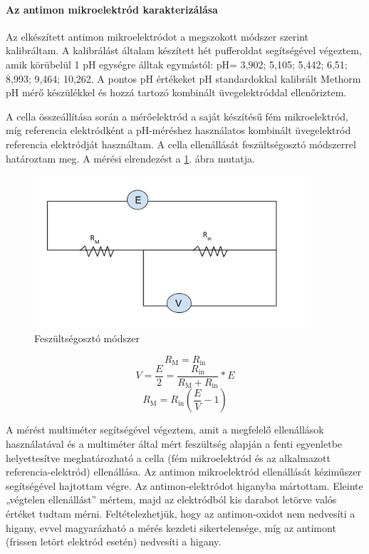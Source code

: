 \paragraph{Az antimon mikroelektród karakterizálása}\label{karakterizalas}
Az elkészített antimon mikroelektródot a megszokott módszer szerint kalibráltam. A kalibrálást általam készített hét pufferoldat segítségével végeztem, amik körübelül 1 pH egységre álltak egymástól: pH= 3,902; 5,105; 5,442; 6,51; 8,993; 9,464; 10,262. A pontos pH értékeket pH standardokkal kalibrált Methorm pH mérő készülékkel és hozzá tartozó kombinált üvegelektróddal ellenőriztem. 

A cella összeállítása során a mérőelektród a saját készítésű fém mikroelektród, míg referencia elektródként a pH-méréshez használatos kombinált üvegelektród referencia elektródját használtam.
A cella ellenállását feszültségosztó módszerrel határoztam meg. A mérési elrendezést a \ref{fig:feszultsegoszto}. ábra mutatja. 

\begin{figure}[h]
\centering
\includegraphics[width=0.9\textwidth]{img/feszultsegoszto.png}
\caption{Feszültségosztó módszer}
\label{fig:feszultsegoszto}
\end{figure}

\begin{equation}
R_\text{M} = R_\text{in}
\end{equation}
\begin{equation}
V = \frac{E}{2} = \frac{R_\text{in}}{R_\text{M} + R_\text{in}} * E
\end{equation}
\begin{equation} 
\label{eq:A}
R_\text{M} = R_\text{in} (\frac{E}{V} -1)
\end{equation}

A mérést multiméter segítségével végeztem, amit a megfelelő ellenállások használatával és a multiméter által mért feszültség alapján a fenti egyenletbe helyettesítve meghatározható a cella (fém     mikroelektród és az alkalmazott referencia-elektród) ellenállása. Az antimon mikroelektród ellenállását kéziműszer segítségével hajtottam végre. Az antimon-elektródot higanyba mártottam. Eleinte „végtelen ellenállást” mértem, majd az elektródból kis darabot letörve valós értéket tudtam mérni. Feltételezhetjük, hogy az antimon-oxidot nem nedvesíti a higany, evvel magyarázható a mérés kezdeti sikertelensége, míg az antimont (frissen letört elektród esetén) nedvesíti a higany.

